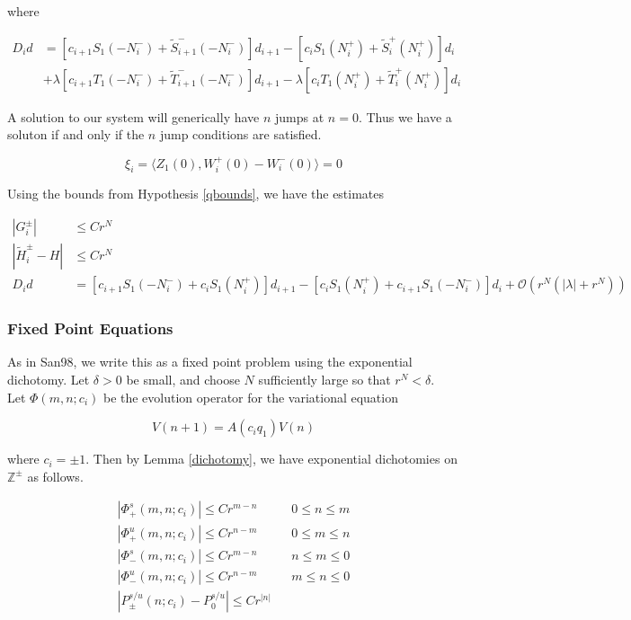 \documentclass[12pt]{article}
\def\Z{{\mathbb Z}}
\begin{document}
where

\begin{align*}
D_i d &= [ c_{i+1} S_1(-N_i^-) + \tilde{S}_{i+1}^-(-N_i^-)] d_{i+1}
- [ c_i S_1(N_i^+) + \tilde{S}_i^+(N_i^+)] d_i \\
&+ \lambda[ c_{i+1} T_1(-N_i^-) + \tilde{T}_{i+1}^-(-N_i^-)] d_{i+1}
- \lambda[ c_i T_1(N_i^+) + \tilde{T}_i^+(N_i^+)] d_i 
\end{align*}

A solution to our system will generically have $n$ jumps at $n = 0$. Thus we have a soluton if and only if the $n$ jump conditions are satisfied.

\begin{equation}\label{jumpcond}
\xi_i = \langle Z_1(0), W_i^+(0) - W_i^-(0) \rangle = 0
\end{equation}

Using the bounds from Hypothesis \ref{qbounds}, we have the estimates

\begin{align*}
|G_i^\pm| &\leq C r^N \\
|\tilde{H}_i^\pm - H| &\leq C r^N \\
D_i d &= [ c_{i+1} S_1(-N_i^-) + c_i S_1(N_i^+) ] d_{i+1}
- [ c_i S_1(N_i^+) + c_{i+1} S_1(-N_i^-) ] d_i 
+\mathcal{O}(r^N( |\lambda| + r^N))
\end{align*}

\subsubsection{Fixed Point Equations}

As in San98, we write this as a fixed point problem using the exponential dichotomy. Let $\delta > 0$ be small, and choose $N$ sufficiently large so that $r^N < \delta$. \\

Let $\Phi(m, n; c_i)$ be the evolution operator for the variational equation

\[
V(n+1) = A(c_i q_1) V(n) 
\]

where $c_i = \pm 1$. Then by Lemma \ref{dichotomy}, we have exponential dichotomies on $\Z^\pm$ as follows.

\begin{align*}
|\Phi_+^s(m, n; c_i)| \leq C r^{m - n} && 0 \leq n \leq m \\
|\Phi_+^u(m, n; c_i)| \leq C r^{n - m} && 0 \leq m \leq n \\
|\Phi_-^s(m, n; c_i)| \leq C r^{m - n} && n \leq m \leq 0 \\
|\Phi_-^u(m, n; c_i)| \leq C r^{n - m} && m \leq n \leq 0 \\
|P_\pm^{s/u}(n; c_i) - P_0^{s/u}| \leq C r^{|n|}
\end{align*}
\end{document}
